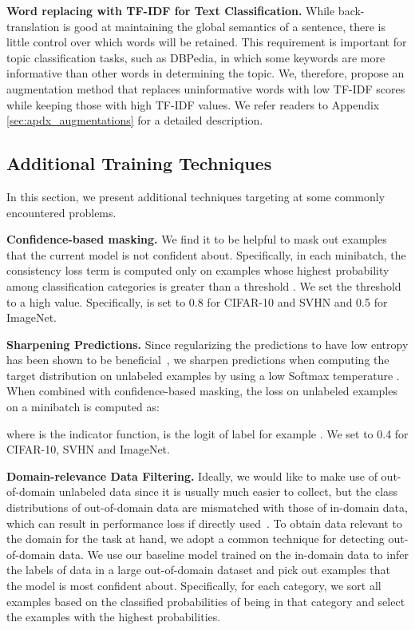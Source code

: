 \documentclass{article}
\begin{document}
\textbf{Word replacing with TF-IDF for Text Classification.} While back-translation is good at maintaining the global semantics of a sentence, there is little control over which words will be retained. This requirement is important for topic classification tasks, such as DBPedia, in which some keywords are more informative than other words in determining the topic. We, therefore, propose an augmentation method that replaces uninformative words with low TF-IDF scores while keeping those with high TF-IDF values. We refer readers to Appendix \ref{sec:apdx_augmentations} for a detailed description.


\vspace{-0.3em}
\subsection{Additional Training Techniques}
\label{sec:apdx_training_technique}
\vspace{-0.3em}

In this section, we present additional techniques targeting at some commonly encountered problems.


\textbf{Confidence-based masking.} We find it to be helpful to mask out examples that the current model is not confident about. Specifically, in each minibatch, the consistency loss term is computed only on examples whose highest probability among classification categories is greater than a threshold . We set the threshold  to a high value. Specifically,  is set to 0.8 for CIFAR-10 and SVHN and 0.5 for ImageNet. 

\textbf{Sharpening Predictions.}
\label{sec:sharpending_predictions}
Since regularizing the predictions to have low entropy has been shown to be beneficial~\cite{grandvalet2005semi,miyato2018virtual}, we sharpen predictions when computing the target distribution on unlabeled examples by using a low Softmax temperature . 
When combined with confidence-based masking, the loss on unlabeled examples  on a minibatch  is computed as:


where  is the indicator function,  is the logit of label  for example . We set  to 0.4 for CIFAR-10, SVHN and ImageNet.


\textbf{Domain-relevance Data Filtering.} 
\label{sec:domain_relevance}
Ideally, we would like to make use of out-of-domain unlabeled data since it is usually much easier to collect, but the class distributions of out-of-domain data are mismatched with those of in-domain data, which can result in performance loss if directly used~\cite{oliver2018realistic}.
To obtain data relevant to the domain for the task at hand, we adopt a common technique for detecting out-of-domain data. 
We use our baseline model trained on the in-domain data to infer the labels of data in a large out-of-domain dataset and pick out examples that the model is most confident about. 
Specifically, for each category, we sort all examples based on the classified probabilities of being in that category and select the examples with the highest probabilities.
\end{document}
